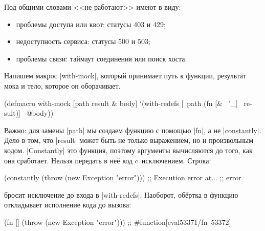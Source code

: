 Под общими словами <<не работают>> имеют в виду:


\begin{itemize}

\item
  проблемы доступа или квот: статусы 403 и 429;

\item
  недоступность сервиса: статусы 500 и 503;

\item
  проблемы связи: таймаут соединения или поиск хоста.

\end{itemize}

Напишем макрос \spverb|with-mock|, который принимает путь к функции, результат
мока и тело, которое он оборачивает.


\begin{english}
  \begin{clojure}
(defmacro with-mock
  [path result & body]
  `(with-redefs
     [~path (fn [& ~'_] ~result)]
     ~@body))
  \end{clojure}
\end{english}

Важно: для замены \spverb|path| мы создаем функцию с помощью \spverb|fn|, а не
\spverb|constantly|. Дело в том, что \spverb|result| может быть не только
выражением, но и произвольным кодом. \spverb|Constantly| это функция, поэтому
аргументы вычисляются до того, как она сработает. Нельзя передать в не\"{е} код
c~исключением. Строка:

\begin{english}
  \begin{clojure}
(constantly (throw (new Exception "error")))
;; Execution error at...
;; error
  \end{clojure}
\end{english}


\noindent
бросит исключение до входа в \spverb|with-redefs|. Наоборот, об\"{е}ртка в
функцию откладывает исполнение кода до вызова:

\begin{english}
  \begin{clojure}
(fn [] (throw (new Exception "error")))
;; #function[eval53371/fn--53372]
  \end{clojure}
\end{english}


